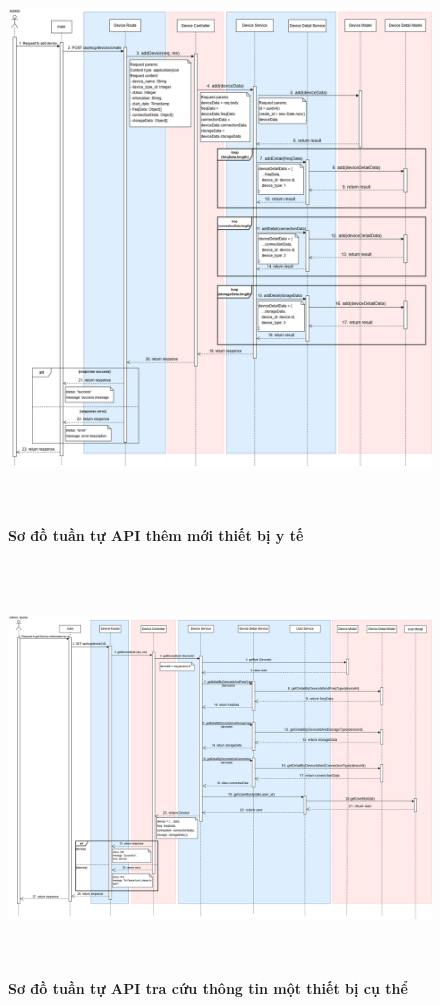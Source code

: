 \begin{figure}[H]
	\centering
	\includegraphics[width=15cm,height=15cm]{Images/api_sequence/device/device-Add.drawio.png}
	\caption[Sơ đồ tuần tự API thêm mới thiết bị y tế]{\bfseries \fontsize{12pt}{0pt}\selectfont Sơ đồ tuần tự API thêm mới thiết bị y tế}
	\label{sequence_diagram_add_device}
\end{figure}

\begin{figure}[H]
	\centering
	\includegraphics[width=15cm,height=11cm]{Images/api_sequence/device/device-GetDeviceById.drawio.png}
	\caption[Sơ đồ tuần tự API tra cứu thông tin một thiết bị cụ thể]{\bfseries \fontsize{12pt}{0pt}\selectfont Sơ đồ tuần tự API tra cứu thông tin một thiết bị cụ thể}
	\label{sequence_diagram_add_device}
\end{figure}


